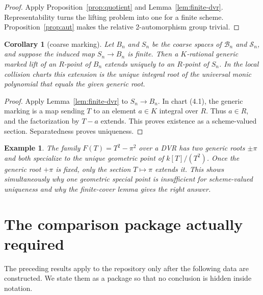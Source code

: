 \documentclass[11pt]{article}
\newtheorem{corollary}[theorem]{Corollary}
\newtheorem{example}[theorem]{Example}
\begin{document}
\begin{proof}
Apply Proposition~\ref{prop:quotient} and
Lemma~\ref{lem:finite-dvr}.  Representability turns the lifting problem into
one for a finite scheme.  Proposition~\ref{prop:aut} makes the relative
2-automorphism group trivial.
\end{proof}

\begin{corollary}[coarse marking]\label{cor:coarse-dvr}
Let $B_n$ and $S_n$ be the coarse spaces of $\mathscr B_n$ and
$\mathscr S_n$, and suppose the induced map $S_n\to B_n$ is finite.  Then a
$K$-rational generic marked lift of an $R$-point of $B_n$ extends uniquely to
an $R$-point of $S_n$.  In the local collision charts this extension is the
unique integral root of the universal monic polynomial that equals the given
generic root.
\end{corollary}

\begin{proof}
Apply Lemma~\ref{lem:finite-dvr} to $S_n\to B_n$.  In chart (4.1), the
generic marking is a map sending $T$ to an element $a\in K$ integral over
$R$.  Thus $a\in R$, and the factorization by $T-a$ extends.  This proves
existence as a scheme-valued section.  Separatedness proves uniqueness.
\end{proof}

\begin{example}
The family $F(T)=T^2-\pi^2$ over a DVR has two generic roots $\pm\pi$ and
both specialize to the unique geometric point of $k[T]/(T^2)$.  Once the
generic root $+\pi$ is fixed, only the section $T\mapsto\pi$ extends it.  This
shows simultaneously why one geometric special point is insufficient for
scheme-valued uniqueness and why the finite-cover lemma gives the right
answer.
\end{example}

\section{The comparison package actually required}

The preceding results apply to the repository only after the following data
are constructed.  We state them as a package so that no conclusion is hidden
inside notation.
\end{document}
